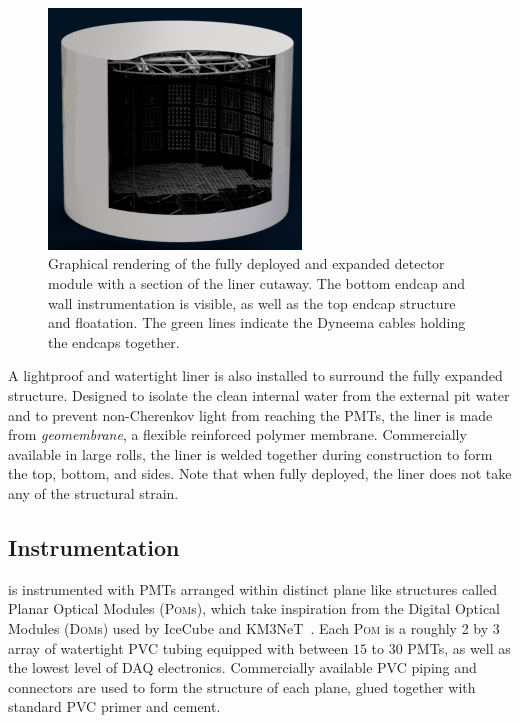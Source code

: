 \begin{figure} %
    \includegraphics[width=0.6\textwidth]{diagrams/4-chips/chips_render.pdf}
    \caption[Graphical rendering of the \chipsfive detector]
    {Graphical rendering of the fully deployed and expanded \chipsfive detector module with a
        section of the liner cutaway. The bottom endcap and wall instrumentation is visible, as
        well as the top endcap structure and floatation. The green lines indicate the Dyneema
        cables holding the endcaps together.}
    \label{fig:chips_render}
\end{figure}

A lightproof and watertight liner is also installed to surround the fully expanded structure.
Designed to isolate the clean internal water from the external pit water and to prevent
non-Cherenkov light from reaching the PMTs, the liner is made from \emph{geomembrane}, a flexible
reinforced polymer membrane. Commercially available in large rolls, the liner is welded together
during construction to form the top, bottom, and sides. Note that when fully deployed, the liner
does not take any of the structural strain.

\subsection{Instrumentation} %
\label{sec:chips_detector_instrumentation} %

\chipsfive is instrumented with PMTs arranged within distinct plane like structures called Planar
Optical Modules (\textsc{Pom}s), which take inspiration from the Digital Optical Modules
(\textsc{Dom}s) used by IceCube and KM3NeT~\cite{hanson2006, eijk2015}. Each \textsc{Pom} is a
roughly \SI{2}{} by \SI{3}{} array of watertight PVC tubing equipped with between
$15$ to $30$ PMTs, as well as the lowest level of DAQ electronics. Commercially available PVC
piping and connectors are used to form the structure of each plane, glued together with standard
PVC primer and cement.

